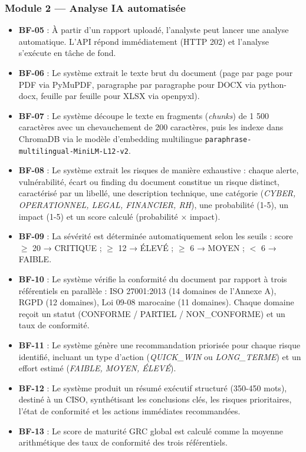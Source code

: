 \subsubsection*{Module 2 — Analyse IA automatisée}

\begin{itemize}
  \item \textbf{BF-05} : À partir d'un rapport uploadé, l'analyste peut
    lancer une analyse automatique. L'API répond immédiatement (HTTP 202)
    et l'analyse s'exécute en tâche de fond.
  \item \textbf{BF-06} : Le système extrait le texte brut du document
    (page par page pour PDF via PyMuPDF, paragraphe par paragraphe pour
    DOCX via python-docx, feuille par feuille pour XLSX via openpyxl).
  \item \textbf{BF-07} : Le système découpe le texte en fragments
    (\textit{chunks}) de 1 500 caractères avec un chevauchement de 200
    caractères, puis les indexe dans ChromaDB via le modèle d'embedding
    multilingue \texttt{paraphrase-multilingual-MiniLM-L12-v2}.
  \item \textbf{BF-08} : Le système extrait les risques de manière
    exhaustive : chaque alerte, vulnérabilité, écart ou finding du document
    constitue un risque distinct, caractérisé par un libellé, une
    description technique, une catégorie (\textit{CYBER, OPERATIONNEL,
    LEGAL, FINANCIER, RH}), une probabilité (1-5), un impact (1-5) et
    un score calculé (probabilité × impact).
  \item \textbf{BF-09} : La sévérité est déterminée automatiquement selon
    les seuils : score $\geq$ 20 → CRITIQUE ; $\geq$ 12 → ÉLEVÉ ;
    $\geq$ 6 → MOYEN ; $<$ 6 → FAIBLE.
  \item \textbf{BF-10} : Le système vérifie la conformité du document par
    rapport à trois référentiels en parallèle : ISO 27001:2013 (14 domaines
    de l'Annexe A), RGPD (12 domaines), Loi 09-08 marocaine (11 domaines).
    Chaque domaine reçoit un statut (CONFORME / PARTIEL / NON\_CONFORME)
    et un taux de conformité.
  \item \textbf{BF-11} : Le système génère une recommandation priorisée
    pour chaque risque identifié, incluant un type d'action
    (\textit{QUICK\_WIN} ou \textit{LONG\_TERME}) et un effort estimé
    (\textit{FAIBLE, MOYEN, ÉLEVÉ}).
  \item \textbf{BF-12} : Le système produit un résumé exécutif structuré
    (350-450 mots), destiné à un CISO, synthétisant les conclusions
    clés, les risques prioritaires, l'état de conformité et les actions
    immédiates recommandées.
  \item \textbf{BF-13} : Le score de maturité GRC global est calculé comme
    la moyenne arithmétique des taux de conformité des trois référentiels.
\end{itemize}

